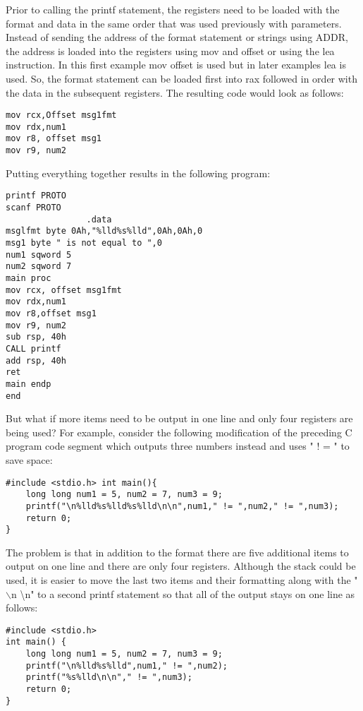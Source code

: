 \documentclass[10pt]{article}
\begin{document}
Prior to calling the printf statement, the registers need to be loaded with the format and data in the same order that was used previously with parameters. Instead of sending the address of the format statement or strings using ADDR, the address is loaded into the registers using mov and offset or using the lea instruction. In this first example mov offset is used but in later examples lea is used. So, the format statement can be loaded first into rax followed in order with the data in the subsequent registers. The resulting code would look as follows:

\begin{verbatim}
mov rcx,Offset msg1fmt
mov rdx,num1
mov r8, offset msg1
mov r9, num2
\end{verbatim}

Putting everything together results in the following program:

\begin{verbatim}
printf PROTO
scanf PROTO
                .data
msglfmt byte 0Ah,"%lld%s%lld",0Ah,0Ah,0
msg1 byte " is not equal to ",0
num1 sqword 5
num2 sqword 7
main proc
mov rcx, offset msg1fmt
mov rdx,num1
mov r8,offset msg1
mov r9, num2
sub rsp, 40h
CALL printf
add rsp, 40h
ret
main endp
end
\end{verbatim}

But what if more items need to be output in one line and only four registers are being used? For example, consider the following modification of the preceding C program code segment which outputs three numbers instead and uses " ! = " to save space:

\begin{verbatim}
#include <stdio.h> int main(){
    long long num1 = 5, num2 = 7, num3 = 9;
    printf("\n%lld%s%lld%s%lld\n\n",num1," != ",num2," != ",num3);
    return 0;
}
\end{verbatim}

The problem is that in addition to the format there are five additional items to output on one line and there are only four registers. Although the stack could be used, it is easier to move the last two items and their formatting along with the " $\backslash \mathrm{n}$ \textbackslash n" to a second printf statement so that all of the output stays on one line as follows:

\begin{verbatim}
#include <stdio.h>
int main() {
    long long num1 = 5, num2 = 7, num3 = 9;
    printf("\n%lld%s%lld",num1," != ",num2);
    printf("%s%lld\n\n"," != ",num3);
    return 0;
}
\end{verbatim}
\end{document}

